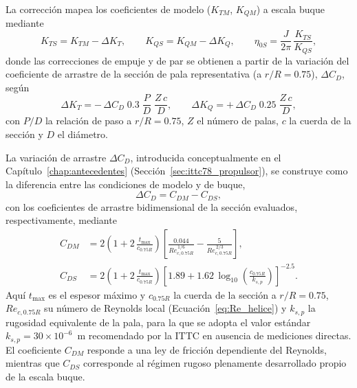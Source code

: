 La corrección mapea los coeficientes de modelo ($K_{TM}$, $K_{QM}$) a escala buque
mediante
%
\begin{equation}
    K_{TS} = K_{TM} - \Delta K_T, \qquad
    K_{QS} = K_{QM} - \Delta K_Q, \qquad
    \eta_{0S} = \frac{J}{2\pi}\,\frac{K_{TS}}{K_{QS}},
    \label{eq:ittc78_KtKq_buque}
\end{equation}
%
donde las correcciones de empuje y de par se obtienen a partir de la variación del
coeficiente de arrastre de la sección de pala representativa (a $r/R = 0.75$),
$\Delta C_D$, según
%
\begin{equation}
    \Delta K_T = -\,\Delta C_D \; 0.3 \; \frac{P}{D} \; \frac{Z\,c}{D},
    \qquad
    \Delta K_Q = +\,\Delta C_D \; 0.25 \; \frac{Z\,c}{D},
    \label{eq:ittc78_deltaKtKq}
\end{equation}
%
con $P/D$ la relación de paso a $r/R = 0.75$, $Z$ el número de palas, $c$ la cuerda de
la sección y $D$ el diámetro.

La variación de arrastre $\Delta C_D$, introducida conceptualmente en el
Capítulo~\ref{chap:antecedentes} (Sección~\ref{sec:ittc78_propulsor}), se construye como
la diferencia entre las condiciones de modelo y de buque,
%
\begin{equation}
    \Delta C_D = C_{DM} - C_{DS},
    \label{eq:ittc78_deltacd}
\end{equation}
%
con los coeficientes de arrastre bidimensional de la sección evaluados, respectivamente,
mediante
%
\begin{align}
    C_{DM} &= 2\left(1 + 2\,\frac{t_{\max}}{c_{0.75R}}\right)
              \left[\frac{0.044}{Re_{c,0.75R}^{\,1/6}} - \frac{5}{Re_{c,0.75R}^{\,2/3}}\right],
    \label{eq:ittc78_cdm}\\[4pt]
    C_{DS} &= 2\left(1 + 2\,\frac{t_{\max}}{c_{0.75R}}\right)
              \left[1.89 + 1.62\,\log_{10}\!\left(\frac{c_{0.75R}}{k_{s,p}}\right)\right]^{-2.5}.
    \label{eq:ittc78_cds}
\end{align}
%
Aquí $t_{\max}$ es el espesor máximo y $c_{0.75R}$ la cuerda de la sección a $r/R = 0.75$, $Re_{c,0.75R}$ su número de
Reynolds local (Ecuación~\eqref{eq:Re_helice}) y $k_{s,p}$ la rugosidad equivalente de la
pala, para la que se adopta el valor estándar $k_{s,p} = 30\times10^{-6}$~m recomendado por
la ITTC en ausencia de mediciones directas. El coeficiente $C_{DM}$ responde a una ley
de fricción dependiente del Reynolds, mientras que $C_{DS}$ corresponde al régimen
rugoso plenamente desarrollado propio de la escala buque.

